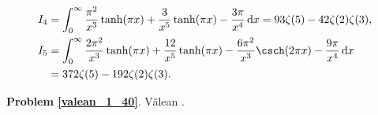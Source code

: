 %

\begin{problem_with_solution}
    \label{valean_1_40}%
    \begin{align}
        I_4 & = \int_0^\infty \frac{\pi^2}{x^3} \tanh (\pi x)  + \frac{3}{x^5} \tanh(\pi x) - \frac{3\pi}{x^4} \,\mathrm{d}x = 93 \zeta(5) - 42 \zeta(2) \zeta(3), \\
        I_5 & = \int_0^\infty \frac{2\pi^2}{x^3} \tanh(\pi x) + \frac{12}{x^5} \tanh (\pi x) - \frac{6 \pi^2}{x^3} \csch (2 \pi x) - \frac{9 \pi}{x^4} \,\mathrm{d} x \\
        & = 372 \zeta(5) - 192 \zeta(2)\zeta(3).
    \end{align} 
\end{problem_with_solution}


\textbf{Problem \ref{valean_1_40}}.
Vălean \cite[s. 26, 27]{nahin15}.


%